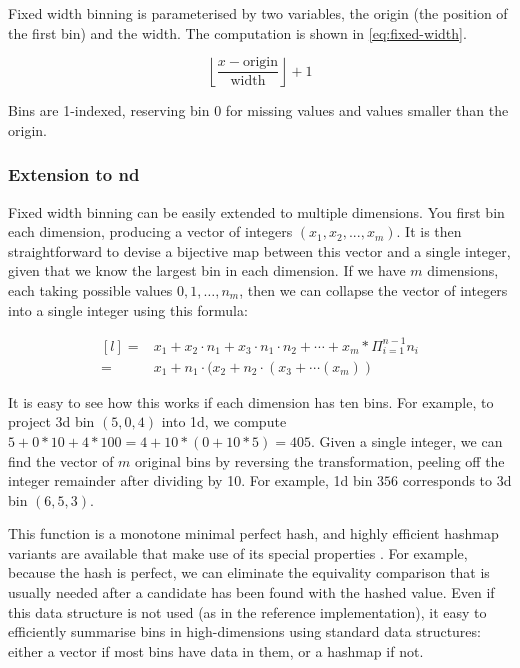 \documentclass[journal]{vgtc}                %
\begin{document}
Fixed width binning is parameterised by two variables, the origin (the position of the first bin) and the width. The computation is shown in \eqref{eq:fixed-width}.

\begin{equation}
  \label{eq:fixed-width}
  \left \lfloor \frac{x - \text{origin}}{\text{width}} \right \rfloor + 1
\end{equation}

Bins are 1-indexed, reserving bin 0 for missing values and values smaller than the origin.

\subsubsection{Extension to nd}

Fixed width binning can be easily extended to multiple dimensions. You first bin each dimension, producing a vector of integers $(x_1, x_2, ..., x_m)$. It is then straightforward to devise a bijective map between this vector and a single integer, given that we know the largest bin in each dimension. If we have $m$ dimensions, each taking possible values $0, 1, \ldots, n_m$, then we can collapse the vector of integers into a single integer using this formula:

\begin{equation}
  \label{eq:nd-bins}
  \begin{matrix*}[l]
   = & x_1 + x_2 \cdot n_1 + x_3 \cdot n_1 \cdot n_2 + \cdots + x_m * \Pi^{n-1}_{i = 1} n_i \\
   = & x_1 + n_1 \cdot (x_2 + n_2 \cdot (x_3 + \cdots(x_m))
  \end{matrix*}
\end{equation}

It is easy to see how this works if each dimension has ten bins. For example, to project 3d bin $(5, 0, 4)$ into 1d, we compute $5 + 0 * 10 + 4 * 100 = 4 + 10 * (0 + 10 * 5) = 405$. Given a single integer, we can find the vector of $m$ original bins by reversing the transformation, peeling off the integer remainder after dividing by 10. For example, 1d bin $356$ corresponds to 3d bin $(6, 5, 3)$.

This function is a monotone minimal perfect hash, and highly efficient hashmap variants are available that make use of its special properties \citep{belazzougui:2009}. For example, because the hash is perfect, we can eliminate the equivality comparison that is usually needed after a candidate has been found with the hashed value. Even if this data structure is not used (as in the reference implementation), it easy to efficiently summarise bins in high-dimensions using standard data structures: either a vector if most bins have data in them, or a hashmap if not.
\end{document}
